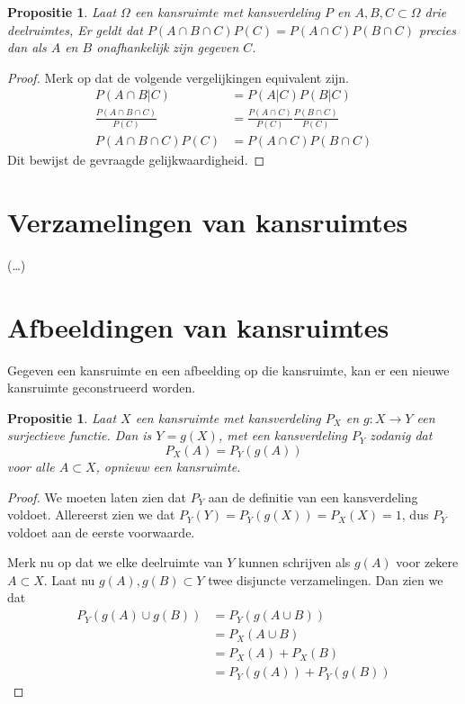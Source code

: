 \documentclass[a4paper]{report}
\newtheorem{proposition}[theorem]{Propositie}
\theoremstyle{definition}
\begin{document}
\begin{proposition}
    Laat $\Omega$ een kansruimte met kansverdeling $P$ en $A,B,C \subset \Omega$ drie deelruimtes,
    Er geldt dat $P(A \cap B \cap C)P(C) = P(A \cap C)P(B \cap C)$ precies dan als $A$ en $B$ onafhankelijk zijn gegeven $C$.
\end{proposition}
\begin{proof}
    Merk op dat de volgende vergelijkingen equivalent zijn.
    \begin{align*}
        P(A \cap B|C)                       &= P(A|C)P(B|C) \\
        \frac{P(A \cap B \cap C)}{P(C)}     &= \frac{P(A \cap C)}{P(C)} \frac{P(B \cap C)}{P(C)} \\
        P(A \cap B \cap C)P(C)              &= P(A \cap C)P(B \cap C)
    \end{align*}
    Dit bewijst de gevraagde gelijkwaardigheid.
\end{proof}

\section{Verzamelingen van kansruimtes}
(\dots)

\section{Afbeeldingen van kansruimtes}
Gegeven een kansruimte en een afbeelding op die kansruimte, kan er een nieuwe kansruimte geconstrueerd worden.

\begin{proposition}
    Laat $X$ een kansruimte met kansverdeling $P_X$ en $g: X \to Y$ een surjectieve functie.
    Dan is $Y = g(X)$, met een kansverdeling $P_Y$ zodanig dat
    \[ P_X(A) = P_Y(g(A)) \]
    voor alle $A \subset X$, opnieuw een kansruimte.
\end{proposition}
\begin{proof}
    We moeten laten zien dat $P_Y$ aan de definitie van een kansverdeling voldoet.
    Allereerst zien we dat $P_Y(Y) = P_Y(g(X)) = P_X(X) = 1$, dus $P_Y$ voldoet aan de eerste voorwaarde.

    Merk nu op dat we elke deelruimte van $Y$ kunnen schrijven als $g(A)$ voor zekere $A \subset X$.
    Laat nu $g(A),g(B) \subset Y$ twee disjuncte verzamelingen.
    Dan zien we dat
    \begin{align*}
        P_Y(g(A) \cup g(B)) &= P_Y(g(A \cup B)) \\
                            &= P_X(A \cup B) \\
                            &= P_X(A) + P_X(B) \\
                            &= P_Y(g(A)) + P_Y(g(B))
    \end{align*}

\end{proof}
\end{document}

